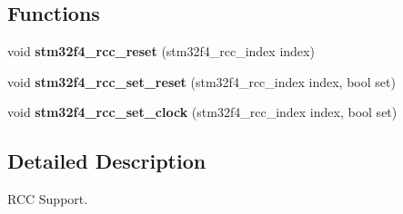 \subsection*{Functions}
\begin{DoxyCompactItemize}
\item 
\mbox{\label{group__stm32f4__rcc_gac32c03a52281591290e0a052cb6f93e2}} 
void {\bfseries stm32f4\+\_\+rcc\+\_\+reset} (stm32f4\+\_\+rcc\+\_\+index index)
\item 
\mbox{\label{group__stm32f4__rcc_gadff1d445540c9f2b0185312fa7c5476c}} 
void {\bfseries stm32f4\+\_\+rcc\+\_\+set\+\_\+reset} (stm32f4\+\_\+rcc\+\_\+index index, bool set)
\item 
\mbox{\label{group__stm32f4__rcc_ga37da3f34823fe6484214d3b3d93ff2b5}} 
void {\bfseries stm32f4\+\_\+rcc\+\_\+set\+\_\+clock} (stm32f4\+\_\+rcc\+\_\+index index, bool set)
\end{DoxyCompactItemize}


\subsection{Detailed Description}
R\+CC Support. 

